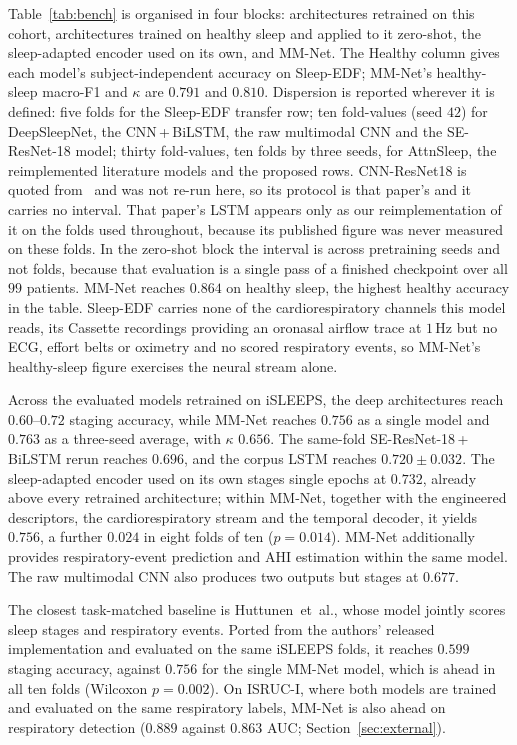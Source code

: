\documentclass[a4paper,fleqn]{cas-sc}
\newcommand{\mmAcc}{0.763}
\newcommand{\mmAccS}{0.756}
\newcommand{\mmK}{0.656}
\begin{document}
Table~\ref{tab:bench} is organised in four blocks: architectures retrained on this
cohort, architectures trained on healthy sleep and applied to it zero-shot, the
sleep-adapted encoder used on its own, and MM-Net. The Healthy column gives each model's
subject-independent accuracy on Sleep-EDF; MM-Net's healthy-sleep macro-F1 and $\kappa$ are
$0.791$ and $0.810$.
Dispersion is reported wherever it is defined: five folds for the Sleep-EDF transfer row;
ten fold-values (seed $42$) for DeepSleepNet, the CNN\,+\,BiLSTM, the raw multimodal CNN and
the SE-ResNet-18 model; thirty fold-values, ten folds by three seeds, for AttnSleep, the
reimplemented literature models and the proposed rows. CNN-ResNet18 is quoted
from~\cite{bose2026gap} and was not re-run here, so its protocol is that paper's and it
carries no interval. That paper's LSTM appears only as our reimplementation of it on the
folds used throughout, because its published figure was never measured on these folds. In the zero-shot block the interval is across
pretraining seeds and not folds, because that evaluation is a single pass of a finished
checkpoint over all $99$ patients. MM-Net reaches $0.864$ on healthy sleep, the highest
healthy accuracy in the table. Sleep-EDF carries none of the cardiorespiratory
channels this model reads, its Cassette recordings providing an oronasal airflow trace at
$1$\,Hz but no ECG, effort belts or oximetry and no scored respiratory events, so MM-Net's
healthy-sleep figure exercises the neural stream alone.

Across the evaluated models retrained on iSLEEPS, the deep architectures reach
$0.60$--$0.72$ staging accuracy, while MM-Net reaches $\mmAccS$ as a single model and
$\mmAcc$ as a three-seed average, with $\kappa$ $\mmK$. The same-fold
SE-ResNet-18\,+\,BiLSTM rerun reaches $0.696$, and the corpus LSTM reaches
$0.720 \pm 0.032$. The sleep-adapted encoder used on its own stages single epochs at
$0.732$, already above every retrained architecture; within MM-Net, together with the
engineered descriptors, the cardiorespiratory stream and the temporal decoder, it yields
$\mmAccS$, a further $0.024$ in eight folds of ten ($p=0.014$). MM-Net additionally provides
respiratory-event prediction and AHI estimation within the same model. The raw multimodal
CNN also produces two outputs but stages at $0.677$.

The closest task-matched baseline is Huttunen~et~al., whose model jointly scores
sleep stages and respiratory events. Ported from the authors' released implementation
and evaluated on the same iSLEEPS folds, it reaches $0.599$ staging accuracy, against
$\mmAccS$ for the single MM-Net model, which is ahead in all ten folds (Wilcoxon $p=0.002$).
On ISRUC-I, where both models are trained and evaluated on the same respiratory labels,
MM-Net is also ahead on respiratory detection ($0.889$ against $0.863$ AUC;
Section~\ref{sec:external}).
\end{document}
